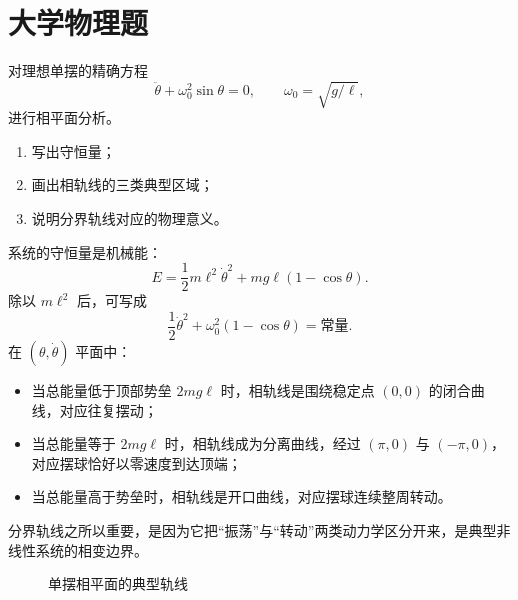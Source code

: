 \section{大学物理题}

\begin{university}
对理想单摆的精确方程
\[
\ddot\theta+\omega_0^2\sin\theta=0,
\qquad \omega_0=\sqrt{g/\ell},
\]
进行相平面分析。
\begin{enumerate}
  \item 写出守恒量；
  \item 画出相轨线的三类典型区域；
  \item 说明分界轨线对应的物理意义。
\end{enumerate}
\begin{solution}
系统的守恒量是机械能：
\[
E=\frac12 m\ell^2\dot\theta^2+mg\ell(1-\cos\theta).
\]
除以 $m\ell^2$ 后，可写成
\[
\frac12 \dot\theta^2+\omega_0^2(1-\cos\theta)=\text{常量}.
\]
在 $(\theta,\dot\theta)$ 平面中：
\begin{itemize}
  \item 当总能量低于顶部势垒 $2mg\ell$ 时，相轨线是围绕稳定点 $(0,0)$ 的闭合曲线，对应往复摆动；
  \item 当总能量等于 $2mg\ell$ 时，相轨线成为分离曲线，经过 $(\pi,0)$ 与 $(-\pi,0)$，对应摆球恰好以零速度到达顶端；
  \item 当总能量高于势垒时，相轨线是开口曲线，对应摆球连续整周转动。
\end{itemize}
分界轨线之所以重要，是因为它把“振荡”与“转动”两类动力学区分开来，是典型非线性系统的相变边界。

\begin{figure}[H]
\centering
{}
\caption{单摆相平面的典型轨线}
\end{figure}
\end{solution}
\end{university}

